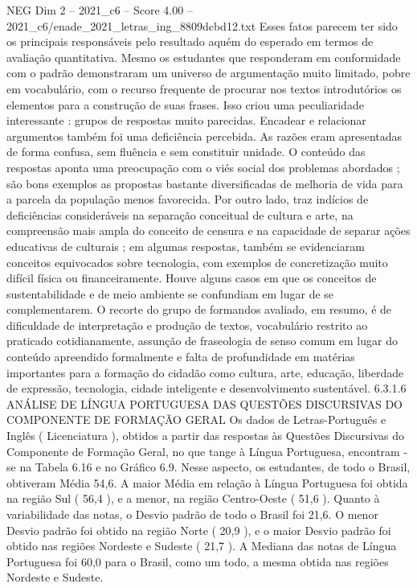 \begin{textsample}{NEG Dim 2 – 2021\_c6 – Score 4.00 – 2021\_c6/enade\_2021\_letras\_ing\_8809dcbd12.txt}
Esses fatos parecem ter sido os principais responsáveis pelo resultado aquém do esperado em termos de avaliação quantitativa.
Mesmo os estudantes que responderam em conformidade com o padrão demonstraram um universo de argumentação muito limitado, pobre em vocabulário, com o recurso frequente de procurar nos textos introdutórios os elementos para a construção de suas frases.
Isso criou uma peculiaridade interessante : grupos de respostas muito parecidas.
Encadear e relacionar argumentos também foi uma deficiência percebida.
As razões eram apresentadas de forma confusa, sem fluência e sem constituir unidade.
O conteúdo das respostas aponta uma preocupação com o viés social dos problemas abordados ; são bons exemplos as propostas bastante diversificadas de melhoria de vida para a parcela da população menos favorecida.
Por outro lado, traz indícios de deficiências consideráveis na separação conceitual de cultura e arte, na compreensão mais ampla do conceito de censura e na capacidade de separar ações educativas de culturais ; em algumas respostas, também se evidenciaram conceitos equivocados sobre tecnologia, com exemplos de concretização muito difícil física ou financeiramente.
Houve alguns casos em que os conceitos de sustentabilidade e de meio ambiente se confundiam em lugar de se complementarem.
O recorte do grupo de formandos avaliado, em resumo, é de dificuldade de interpretação e produção de textos, vocabulário restrito ao praticado cotidianamente, assunção de fraseologia de senso comum em lugar do conteúdo apreendido formalmente e falta de profundidade em matérias importantes para a formação do cidadão como cultura, arte, educação, liberdade de expressão, tecnologia, cidade inteligente e desenvolvimento sustentável. 6.3.1.6 ANÁLISE DE LÍNGUA PORTUGUESA DAS QUESTÕES DISCURSIVAS DO COMPONENTE DE FORMAÇÃO GERAL Os dados de Letras-Português e Inglês ( Licenciatura ), obtidos a partir das respostas às Questões Discursivas do Componente de Formação Geral, no que tange à Língua Portuguesa, encontram -se na Tabela 6.16 e no Gráfico 6.9.
Nesse aspecto, os estudantes, de todo o Brasil, obtiveram Média 54,6.
A maior Média em relação à Língua Portuguesa foi obtida na região Sul ( 56,4 ), e a menor, na região Centro-Oeste ( 51,6 ).
Quanto à variabilidade das notas, o Desvio padrão de todo o Brasil foi 21,6.
O menor Desvio padrão foi obtido na região Norte ( 20,9 ), e o maior Desvio padrão foi obtido nas regiões Nordeste e Sudeste ( 21,7 ).
A Mediana das notas de Língua Portuguesa foi 60,0 para o Brasil, como um todo, a mesma obtida nas regiões Nordeste e Sudeste.

\end{textsample}

